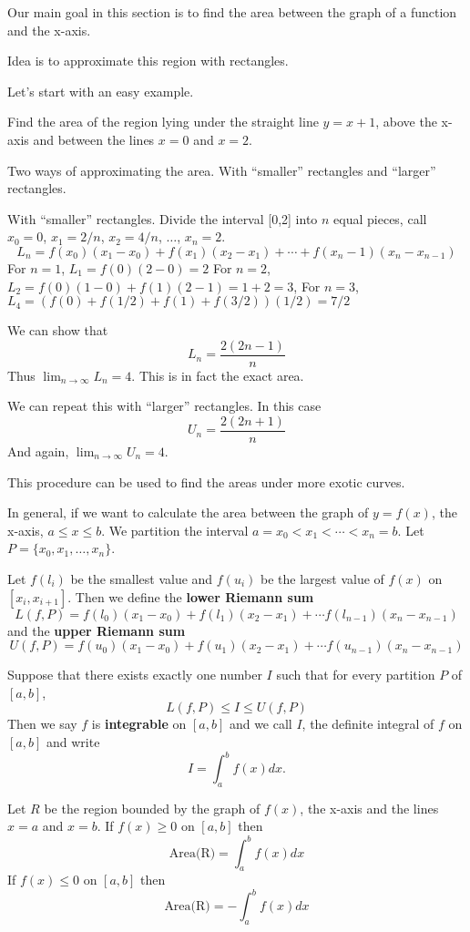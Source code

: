 \documentclass[../calc1-main.tex]{subfiles}
\begin{document}
Our main goal in this section is to find the area between the graph of a function and the x-axis.

Idea is to approximate this region with rectangles.

Let's start with an easy example.
\begin{example}
  Find the area of the region lying under the straight line $y=x+1$, above the x-axis and between the lines $x=0$ and $x=2$.
\end{example}

\begin{solution}
  Two ways of approximating the area. With ``smaller'' rectangles and ``larger'' rectangles.

  With ``smaller'' rectangles. Divide the interval [0,2] into $n$ equal pieces, call $x_0=0$, $x_1=2/n$, $x_2=4/n$, $\dots$, $x_n=2$.
  \[
    L_n = f(x_0) (x_1 - x_0) + f(x_1) (x_2-x_1) + \cdots + f(x_n-1) (x_n-x_{n-1})
  \]
  For $n=1$, $L_1 = f(0) (2-0) = 2$
  For $n=2$, $L_2 = f(0) (1-0) +f(1) (2-1) = 1 + 2 = 3$,
  For $n=3$, $L_4 = (f(0) + f(1/2) + f(1) + f(3/2)) (1/2) = 7/2$

  We can show that
  \[
    L_n = \frac{2(2n-1)}{n}
  \]
  Thus $\lim_{n \to \infty} L_n = 4$. This is in fact the exact area.

  We can repeat this with ``larger'' rectangles. In this case
  \[
    U_n = \frac{2(2n+1)}{n}
  \]
  And again, $\lim_{n \to \infty} U_n = 4$.
\end{solution}

This procedure can be used to find the areas under more exotic curves.

In general, if we want to calculate the area between the graph of $y=f(x)$, the x-axis, $a \le x \le b$. We partition the interval $a=x_0 < x_1 < \cdots < x_n = b$. Let $P=\{x_0, x_1, \dots, x_n\}$.

\begin{definition}
  Let $f(l_i)$ be the smallest value and $f(u_i)$ be the largest value of $f(x)$ on $[x_i, x_{i+1}]$. Then we define the \textbf{lower Riemann sum}
  \[
    L(f, P) = f(l_0) (x_1-x_0) + f(l_1) (x_2-x_1) + \cdots f(l_{n-1}) (x_n - x_{n-1})
  \]
  and the \textbf{upper Riemann sum}
  \[
    U(f, P) = f(u_0) (x_1-x_0) + f(u_1) (x_2-x_1) + \cdots f(u_{n-1}) (x_n - x_{n-1})
  \]

  Suppose that there exists exactly one number $I$ such that for every partition $P$ of $[a, b]$,
  \[
    L(f, P) \le I \le U(f, P)
  \]
  Then we say $f$ is \textbf{integrable} on $[a, b]$ and we call $I$, the definite integral of $f$ on $[a,b]$ and write
  \[
    I = \int_a^b f(x) dx.
  \]
\end{definition}
Let $R$ be the region bounded by the graph of $f(x)$, the x-axis and the lines $x=a$ and $x=b$. If $f(x) \ge 0$ on $[a, b]$ then
\[
  \text{Area(R)} = \int_a^b f(x) dx
\]
If $f(x) \le 0$ on $[a, b]$ then
\[
  \text{Area(R)} = -\int_a^b f(x) dx
\]
\end{document}
